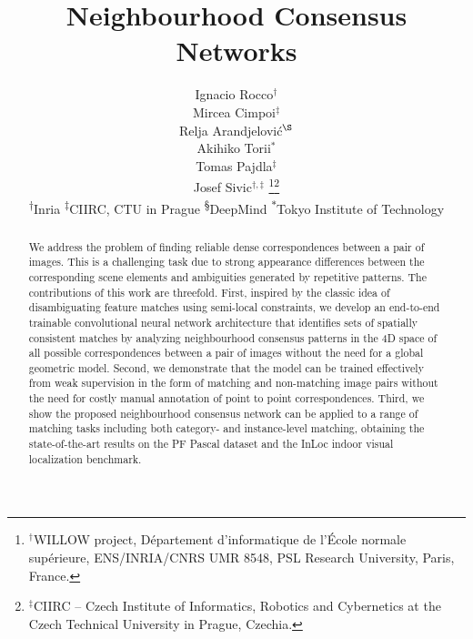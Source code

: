 \documentclass{article}
\begin{document}
\title{Neighbourhood Consensus Networks}

\author{
  Ignacio Rocco$^{\dagger}$ \\
  \And
  Mircea Cimpoi$^{\ddagger}$\\
  \And
  Relja Arandjelovi\'c$^{\S}$\\
  \And
  Akihiko Torii$^{\ast}$\\
  \And
  Tomas Pajdla$^{\ddagger}$\\
  \And
  Josef Sivic$^{\dagger,\ddagger}$
  \thanks{$^\dagger$WILLOW project, Département d’informatique de l’École normale supérieure,  ENS/INRIA/CNRS UMR 8548, PSL Research University, Paris, France.}\thanks{$^\ddagger$CIIRC -- Czech Institute of Informatics, Robotics and Cybernetics at the Czech Technical University in Prague, Czechia.}\\
  \AND
\normalfont
\normalsize\textsuperscript{$\dagger$}Inria\quad 
\normalsize\textsuperscript{$\ddagger$}CIIRC, CTU in Prague\quad 
\normalsize\textsuperscript{\S}DeepMind\quad 
\normalsize\textsuperscript{$\ast$}Tokyo Institute of Technology
}
\maketitle


\begin{abstract}
We address the problem of finding reliable dense correspondences between a pair of images. This is a challenging task due to strong appearance differences between the corresponding scene elements and ambiguities generated by repetitive patterns. The contributions of this work are threefold. First, inspired by the classic idea of disambiguating feature matches using semi-local constraints,  we develop an end-to-end trainable convolutional neural network architecture that identifies sets of spatially consistent  matches by analyzing neighbourhood consensus patterns in the 4D space of all possible correspondences between a pair of images without the need for a global geometric model. Second, we demonstrate that the model can be trained effectively from weak supervision in the form of matching and non-matching image pairs without the need for costly manual annotation of point to point correspondences.
Third, we show the proposed neighbourhood consensus network can be applied to a range of matching tasks including both category- and instance-level matching, obtaining the state-of-the-art results on the PF Pascal dataset and the InLoc indoor visual localization benchmark.
\end{abstract}
\end{document}
